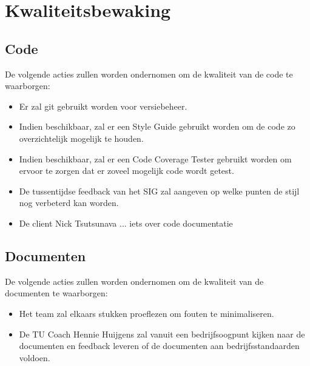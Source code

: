 \section{Kwaliteitsbewaking}
\subsection{Code}
De volgende acties zullen worden ondernomen om de kwaliteit van de code te waarborgen:

\begin{itemize}
	\item Er zal git gebruikt worden voor versiebeheer. 
	\item Indien beschikbaar, zal er een Style Guide gebruikt worden om de code zo overzichtelijk mogelijk te houden.
	\item Indien beschikbaar, zal er een Code Coverage Tester gebruikt worden om ervoor te zorgen dat er zoveel mogelijk code wordt getest. 
	\item De tussentijdse feedback van het SIG zal aangeven op welke punten de stijl nog verbeterd kan worden.
	\item De client Nick Tsutsunava ... iets over code documentatie %
\end{itemize}

\subsection{Documenten}
De volgende acties zullen worden ondernomen om de kwaliteit van de documenten te waarborgen:
\begin{itemize}
	\item Het team zal elkaars stukken proeflezen om fouten te minimaliseren.
	\item De TU Coach Hennie Huijgens zal vanuit een bedrijfsoogpunt kijken naar de documenten en feedback leveren of de documenten aan bedrijfsstandaarden voldoen.
\end{itemize}

